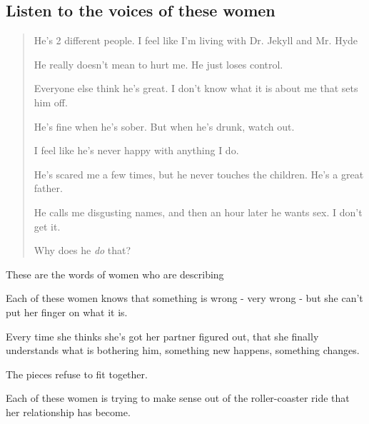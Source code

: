 \documentclass[oneside]{article}
\numberwithin{equation}{section}
\begin{document}
\subsection{Listen to the voices of these women}
\begin{quotation}
    He's 2 different people. I feel like I'm living with Dr. Jekyll and Mr. Hyde
    
    He really doesn't mean to hurt me. He just loses control.
    
    Everyone else think he's great. I don't know what it is about me that sets him off.
    
    He's fine when he's sober. But when he's drunk, watch out.
    
    I feel like he's never happy with anything I do.
    
    He's scared me a few times, but he never touches the children. He's a great father.
    
    He calls me disgusting names, and then an hour later he wants sex. I don't get it.
    
    
    
    Why does he \emph{do} that?
\end{quotation}
These are the words of women who are describing 

Each of these women knows that something is wrong - very wrong - but she can't put her finger on what it is.

Every time she thinks she's got her partner figured out, that she finally understands what is bothering him, something new happens, something changes.

The pieces refuse to fit together.

%
Each of these women is trying to make sense out of the roller-coaster ride that her relationship has become.
\end{document}
